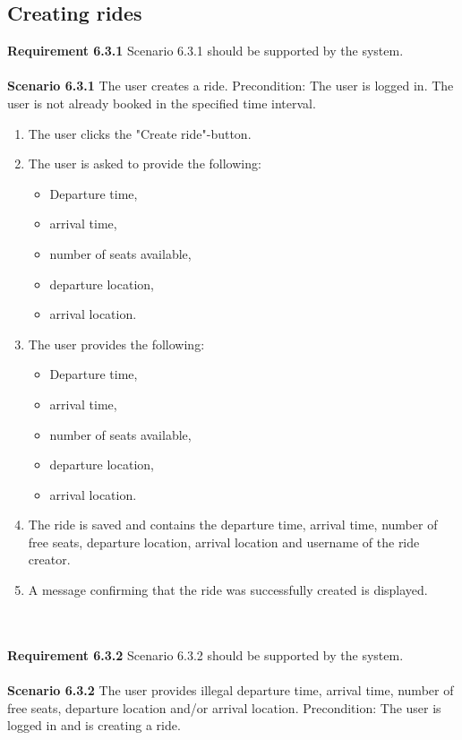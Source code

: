 \documentclass{article}
\begin{document}
\subsection{Creating rides}
\textbf{Requirement 6.3.1} Scenario 6.3.1 should be supported by the system.
\\ \\
\textbf{Scenario 6.3.1} The user creates a ride. Precondition: The user is logged in. The user is not already booked in the specified time interval.
\\
\begin{enumerate}
    \item The user clicks the "Create ride"-button.
    \item The user is asked to provide the following:
        \begin{itemize}
            \item Departure time,
            \item arrival time, 
            \item number of seats available, 
            \item departure location,
            \item arrival location. 
        \end{itemize}
    \item The user provides the following:
        \begin{itemize}
            \item Departure time,
            \item arrival time, 
            \item number of seats available, 
            \item departure location,
            \item arrival location. 
        \end{itemize}
    \item The ride is saved and contains the departure time, arrival time, number of free seats, departure location,  arrival location and username of the ride creator.
    \item A message confirming that the ride was successfully created is displayed.
\end{enumerate}
\mbox{}\\ \\
\textbf{Requirement 6.3.2} Scenario 6.3.2 should be supported by the system.
\\ \\
\textbf{Scenario 6.3.2} The user provides illegal departure time, arrival time, number of free seats, departure location and/or arrival location. Precondition: The user is logged in and is creating a ride.
\end{document}
